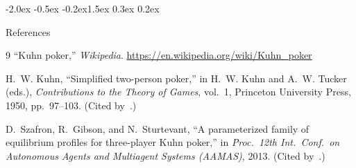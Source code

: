 \documentclass{article}
\makeatletter
\renewcommand{\section}{\@startsection{section}{1}{\z@}%
    {-2.0ex \@plus -0.5ex \@minus -0.2ex}{1.5ex \@plus 0.3ex \@minus 0.2ex}%
    {\large\bf\raggedright}}
\makeatother
\begin{document}
\section{References}
{\renewcommand{\section}[2]{}%
\begin{thebibliography}{9}
\small
{}
``Kuhn poker,'' \emph{Wikipedia}.
\url{https://en.wikipedia.org/wiki/Kuhn_poker}

H.~W. Kuhn, ``Simplified two-person poker,'' in H.~W. Kuhn and A.~W. Tucker
(eds.), \emph{Contributions to the Theory of Games}, vol.~1, Princeton
University Press, 1950, pp.~97--103. (Cited by~\cite{wiki}.)

D.~Szafron, R.~Gibson, and N.~Sturtevant, ``A parameterized family of
equilibrium profiles for three-player Kuhn poker,'' in \emph{Proc.\ 12th Int.\
Conf.\ on Autonomous Agents and Multiagent Systems (AAMAS)}, 2013. (Cited
by~\cite{wiki}.)
\end{thebibliography}}
\end{document}
